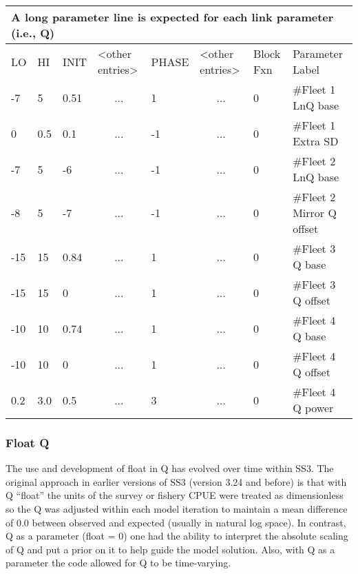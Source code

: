 \begin{longtable}{p{1cm} p{1cm} p{1cm} p{1.5cm} p{1.5cm} p{1.5cm} p{1.75cm} p{4cm}}
	\multicolumn{8}{l}{A long parameter line is expected for each link parameter (i.e., Q)} \\
	\hline
	LO \Tstrut & HI & INIT & <other entries> & PHASE & <other entries> & Block Fxn & Parameter Label \Bstrut\\
	\hline
	-7  & 5   & 0.51 & \multicolumn{1}{c}{...} &  1 & \multicolumn{1}{c}{...} & 0 & \#Fleet 1 LnQ base \Tstrut\\
	 0  & 0.5 & 0.1  & \multicolumn{1}{c}{...} & -1 & \multicolumn{1}{c}{...} & 0 & \#Fleet 1 Extra SD \\
	-7  & 5   & -6   & \multicolumn{1}{c}{...} & -1 & \multicolumn{1}{c}{...} & 0 & \#Fleet 2 LnQ base \\
	-8  & 5   & -7   & \multicolumn{1}{c}{...} & -1 & \multicolumn{1}{c}{...} & 0 & \#Fleet 2 Mirror Q offset \\
	-15 & 15  & 0.84 & \multicolumn{1}{c}{...} &  1 & \multicolumn{1}{c}{...} & 0 & \#Fleet 3 Q base \\
    -15 & 15  & 0    & \multicolumn{1}{c}{...} &  1 & \multicolumn{1}{c}{...} & 0 & \#Fleet 3 Q offset \\
	-10 & 10  & 0.74 & \multicolumn{1}{c}{...} &  1 & \multicolumn{1}{c}{...} & 0 & \#Fleet 4 Q base \\
    -10 & 10  & 0    & \multicolumn{1}{c}{...} &  1 & \multicolumn{1}{c}{...} & 0 & \#Fleet 4 Q offset \\
    0.2 & 3.0 & 0.5  & \multicolumn{1}{c}{...} &  3 & \multicolumn{1}{c}{...} & 0 & \#Fleet 4 Q power \Bstrut\\
	\hline
\end{longtable}

\hypertarget{FloatQ}{}
\subsubsection{Float Q}
The use and development of float in Q has evolved over time within SS3. The original approach in earlier versions of SS3 (version 3.24 and before) is that with Q ``float'' the units of the survey or fishery CPUE were treated as dimensionless so the Q was adjusted within each model iteration to maintain a mean difference of 0.0 between observed and expected (usually in natural log space). In contrast, Q as a parameter (float = 0) one had the ability to interpret the absolute scaling of Q and put a prior on it to help guide the model solution. Also, with Q as a parameter the code allowed for Q to be time-varying.


